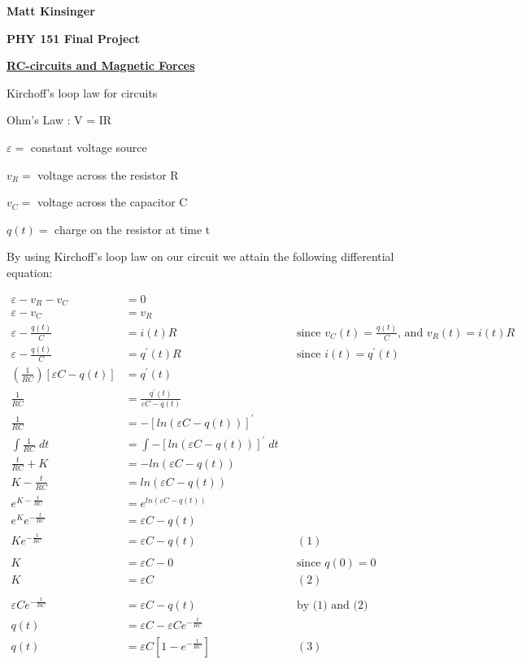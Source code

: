 \documentclass[11pt]{article}
\begin{document}
\vspace*{-.4in}

\begin{center}
{\Large\bf Matt Kinsinger }

{\bf PHY 151 Final Project}

{\bf\underline{RC-circuits and Magnetic Forces}}

\end{center}

\vspace{.1in}

\noindent Kirchoff's loop law for circuits

\noindent Ohm's Law : V = IR

\noindent $\varepsilon =$ constant voltage source


\noindent $v_R=$ voltage across the resistor R

\noindent $v_C=$ voltage across the capacitor C

\noindent $q(t)=$ charge on the resistor at time t

\vspace{.2in}

\noindent By using Kirchoff's loop law on our circuit we attain the following differential equation:

\begin{align*}
\varepsilon-v_R-v_C&=0 \\ \varepsilon-v_C&=v_R \\ \varepsilon-\frac{q(t)}{C}&=i(t)R &&\text{since $v_C(t)=\frac{q(t)}{C}$, and $v_R(t)=i(t)R$} \\ \varepsilon-\frac{q(t)}{C}&=q^{'}(t)R &&\text{since $i(t)=q^{'}(t)$} \\ \left(\frac{1}{RC}\right)\left[\varepsilon C-q(t)\right]&=q^{'}(t) \\ \frac{1}{RC}&=\frac{q^{'}(t)}{\varepsilon C-q(t)} \\ \frac{1}{RC}&=-\left[ln\left(\varepsilon C-q(t)\right)\right]^{'} \\\int\frac{1}{RC}\;dt&=\int-\left[ln\left(\varepsilon C-q(t)\right)\right]^{'}\;dt \\ \frac{t}{RC}+K&=-ln\left(\varepsilon C-q(t)\right) \\ K-\frac{t}{RC}&=ln\left(\varepsilon C-q(t)\right) \\ e^{K-\frac{t}{RC}}&=e^{ln\left(\varepsilon C-q(t)\right)} \\ e^Ke^{-\frac{t}{RC}}&=\varepsilon C-q(t) \\ Ke^{-\frac{t}{RC}}&=\varepsilon C-q(t)&&(1) \\ \\ K&=\varepsilon C-0&&\text{since $q(0)=0$} \\ K&=\varepsilon C&&(2) \\ \\ \varepsilon Ce^{-\frac{t}{RC}}&=\varepsilon C-q(t)&& \text{by (1) and (2)} \\ q(t)&=\varepsilon C-\varepsilon Ce^{-\frac{t}{RC}} \\ q(t)&=\varepsilon C\left[1-e^{-\frac{t}{RC}}\right]&&(3)
\end{align*}
\end{document}
